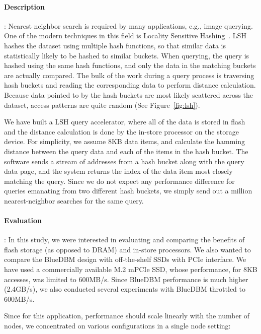 \paragraph{Description} :
Nearest neighbor search is required by many applications, e.g., image querying. One of
the modern techniques in this field is Locality Sensitive Hashing~\cite{lsh}.
LSH hashes the dataset using multiple hash functions, so that
similar data is statistically likely to be hashed to similar buckets. When
querying, the query is hashed using the same hash functions, and only the data
in the matching buckets are actually compared. The bulk of the work during a
query process is traversing hash buckets and reading the corresponding data to
perform distance calculation. Because data pointed to by the hash buckets are
most likely scattered across the dataset, access patterns are quite random (See Figure~\ref{fig:lsh}).




We have built a LSH query accelerator, where all of the data is stored in flash
and the distance calculation is done by the in-store processor on the storage
device. For simplicity, we assume 8KB data items, and calculate the hamming
distance between the query data and each of the items in the hash bucket. The
software sends a stream of addresses from a hash bucket along with the query
data page, and the system returns the index of the data item most closely matching the
query. Since we do not expect any performance difference for queries emanating from two different hash buckets, we simply send out a million nearest-neighbor searches for the same query.

\paragraph{Evaluation} :
In this study, we were interested in evaluating and comparing the benefits of flash storage (as opposed to DRAM) and in-store processors. 
We also wanted to compare the BlueDBM design with off-the-shelf SSDs with PCIe
interface. We have used a commercially available M.2 mPCIe SSD, whose performance, for 8KB accesses, was limited to 600MB/s. Since BlueDBM performance is much higher (2.4GB/s), we also conducted several experiments with BlueDBM throttled to 600MB/s. 

Since for this application, performance should scale linearly with the number of nodes, we concentrated on various configurations in a single node setting:

